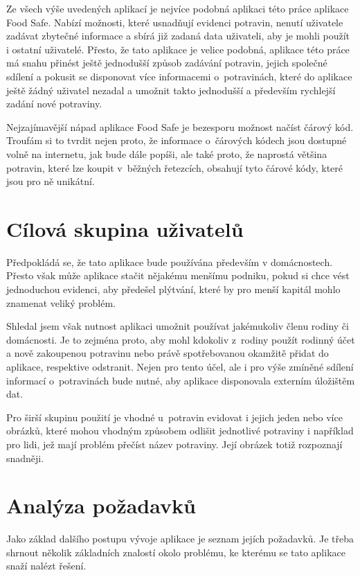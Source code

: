 \documentclass[thesis=B,czech]{FITthesis}[2013/10/20]
\begin{document}
Ze všech výše uvedených aplikací je nejvíce podobná aplikaci této práce aplikace Food Safe. Nabízí možnosti, které usnadňují evidenci potravin, nenutí uživatele zadávat zbytečné informace a sbírá již zadaná data uživateli, aby je mohli použít i ostatní uživatelé. Přesto, že tato aplikace je velice podobná, aplikace této práce má snahu přinést ještě jednodušší způsob zadávání potravin, jejich společné sdílení a pokusit se disponovat více informacemi o~potravinách, které do aplikace ještě žádný uživatel nezadal a umožnit takto jednodušší a především rychlejší zadání nové potraviny.

Nejzajímavější nápad aplikace Food Safe je bezesporu možnost načíst čárový kód. Troufám si to tvrdit nejen proto, že informace o~čárových kódech jsou dostupné volně na internetu, jak bude dále popíši, ale také proto, že naprostá většina potravin, které lze koupit v~běžných řetezcích, obsahují tyto čárové kódy, které jsou pro ně unikátní.

\section{Cílová skupina uživatelů}

Předpokládá se, že tato aplikace bude používána především v domácnostech. Přesto však může aplikace stačit nějakému menšímu podniku, pokud si chce vést jednoduchou evidenci, 
aby předešel plýtvání, které by pro menší kapitál mohlo znamenat veliký problém.

Shledal jsem však nutnost aplikaci umožnit používat jakémukoliv členu rodiny či domácnosti. Je to zejména proto, aby mohl kdokoliv z~rodiny použít rodinný účet a nově zakoupenou potravinu nebo právě spotřebovanou okamžitě přidat do aplikace, respektive odstranit. Nejen pro tento účel, ale i pro výše zmíněné sdílení informací o~potravinách bude nutné, aby aplikace disponovala externím úložištěm dat.

Pro širší skupinu použití je vhodné u~potravin evidovat i jejich jeden nebo více obrázků, které mohou vhodným způsobem odlišit jednotlivé potraviny i například pro lidi, jež mají problém přečíst název potraviny. Její obrázek totiž rozpoznají snadněji.

\clearpage

\section{Analýza požadavků}

Jako základ dalšího postupu vývoje aplikace je seznam jejích požadavků. Je třeba shrnout několik základních znalostí okolo problému, ke kterému se tato aplikace snaží nalézt řešení.
\end{document}
